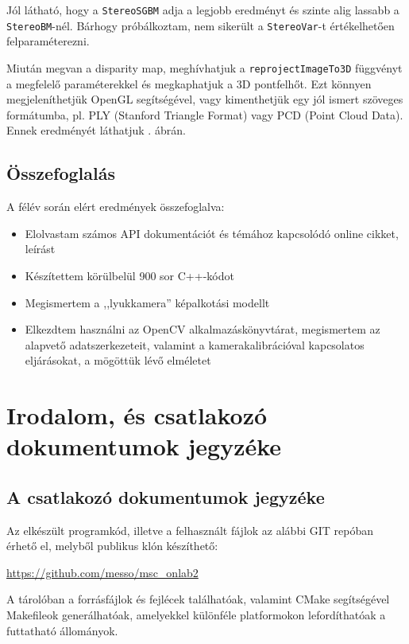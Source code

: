\documentclass[a4paper,oneside]{article}
\begin{document}
Jól látható, hogy a \texttt{StereoSGBM} adja a legjobb eredményt és szinte alig lassabb a \texttt{StereoBM}-nél. Bárhogy próbálkoztam, nem sikerült a \texttt{StereoVar}-t értékelhetően felparaméterezni.

Miután megvan a disparity map, meghívhatjuk a \texttt{reprojectImageTo3D} függvényt a megfelelő paraméterekkel és megkaphatjuk a 3D pontfelhőt. Ezt könnyen megjeleníthetjük OpenGL segítségével, vagy kimenthetjük egy jól ismert szöveges formátumba, pl. PLY (Stanford Triangle Format) vagy PCD (Point Cloud Data). Ennek eredményét láthatjuk . ábrán.

\subsection{Összefoglalás}
\label{sec:osszefoglalas}

A félév során elért eredmények összefoglalva:
\begin{itemize}
\item Elolvastam számos API dokumentációt és témához kapcsolódó online cikket, leírást
\item Készítettem körülbelül 900 sor C++-kódot
\item Megismertem a ,,lyukkamera'' képalkotási modellt
\item Elkezdtem használni az OpenCV alkalmazáskönyvtárat, megismertem az alapvető adatszerkezeteit, valamint a kamerakalibrációval kapcsolatos eljárásokat, a mögöttük lévő elméletet
\end{itemize}
\newpage
 
\section{Irodalom, és csatlakozó dokumentumok jegyzéke}
\label{sec:irod-es-csatl}

\printbibliography[title={Irodalomjegyzék}]

\subsection{A csatlakozó dokumentumok jegyzéke}
\label{sec:csat-irod}

Az elkészült programkód, illetve a felhasznált fájlok az alábbi GIT repóban érhető el, melyből publikus klón készíthető:
\begin{center}
\url{https://github.com/messo/msc_onlab2}
\end{center}

A tárolóban a forrásfájlok és fejlécek találhatóak, valamint CMake segítségével Makefileok generálhatóak, amelyekkel különféle platformokon lefordíthatóak a futtatható állományok.
\end{document}
